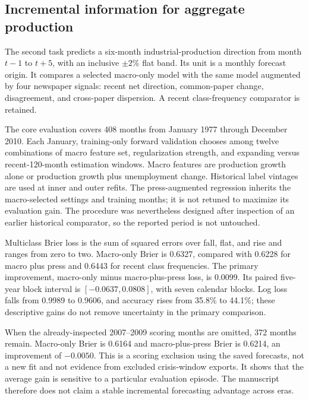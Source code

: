 \subsection{Incremental information for aggregate production}
The second task predicts a six-month industrial-production direction from month $t-1$ to $t+5$, with an inclusive $\pm2\%$ flat band. Its unit is a monthly forecast origin. It compares a selected macro-only model with the same model augmented by four newspaper signals: recent net direction, common-paper change, disagreement, and cross-paper dispersion. A recent class-frequency comparator is retained.

The core evaluation covers 408 months from January 1977 through December 2010. Each January, training-only forward validation chooses among twelve combinations of macro feature set, regularization strength, and expanding versus recent-120-month estimation windows. Macro features are production growth alone or production growth plus unemployment change. Historical label vintages are used at inner and outer refits. The press-augmented regression inherits the macro-selected settings and training months; it is not retuned to maximize its evaluation gain. The procedure was nevertheless designed after inspection of an earlier historical comparator, so the reported period is not untouched.

Multiclass Brier loss is the sum of squared errors over fall, flat, and rise and ranges from zero to two. Macro-only Brier is 0.6327, compared with 0.6228 for macro plus press and 0.6443 for recent class frequencies. The primary improvement, macro-only minus macro-plus-press loss, is 0.0099. Its paired five-year block interval is $[-0.0637,0.0808]$, with seven calendar blocks. Log loss falls from 0.9989 to 0.9606, and accuracy rises from 35.8\% to 44.1\%; these descriptive gains do not remove uncertainty in the primary comparison.

When the already-inspected 2007--2009 scoring months are omitted, 372 months remain. Macro-only Brier is 0.6164 and macro-plus-press Brier is 0.6214, an improvement of $-0.0050$. This is a scoring exclusion using the saved forecasts, not a new fit and not evidence from excluded crisis-window exports. It shows that the average gain is sensitive to a particular evaluation episode. The manuscript therefore does not claim a stable incremental forecasting advantage across eras.

